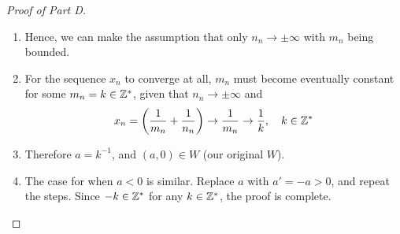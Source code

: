 \documentclass[../../main.tex]{subfiles}
\begin{document}
\begin{proof}[Proof of Part D]
\begin{enumerate}
        \item Hence, we can make the assumption that only $n_n\to \pm\infty$ with $m_n$ being bounded.
        \item For the sequence $x_n$ to converge at all, $m_n$ must become eventually constant for some $m_n=k\in\mathbb{Z}^*$, given that $n_n\to\pm\infty$ and\[x_n=\biggl(\dfrac{1}{m_n}+\dfrac{1}{n_n}\biggr)\to \dfrac{1}{m_n}\to\dfrac{1}{k},\quad k\in\mathbb{Z}^*\] 
        \item Therefore $a=k^{-1}$, and $(a,0)\in W$ (our original $W$).
        \item The case for when $a<0$ is similar. Replace $a$ with $a'=-a>0$, and repeat the steps. Since $-k\in\mathbb{Z}^*$ for any $k\in \mathbb{Z}^*$, the proof is complete.
    \end{enumerate}
\end{proof}
\end{document}

